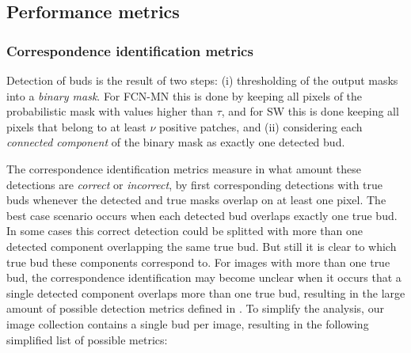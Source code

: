 \documentclass[a4paper,authoryear,review]{elsarticle}
\begin{document}
	\subsection{Performance metrics}
	\label{sec:metrics}
	
	\subsubsection{Correspondence identification metrics}
	\label{subsec:detectmetrics}
	
	Detection of buds is the result of two steps: (i)  thresholding of the output masks into a \emph{binary mask}. For FCN-MN this is done by keeping all pixels of the probabilistic mask with values higher than $\tau$, and for SW this is done keeping all pixels that belong to at least $\nu$ positive patches, and (ii) considering  each \emph{connected component} of the binary mask as exactly one detected bud. 
	
	The correspondence identification metrics measure in what amount these detections are \emph{correct} or \emph{incorrect}, by first corresponding detections with true buds whenever the detected and true masks overlap on at least one pixel. The best case scenario occurs when each detected bud overlaps exactly one true bud. In some cases this correct detection could be splitted with more than one detected component overlapping the same true bud. But still it is clear to which true bud these components correspond to. For images with more than one true bud, the correspondence identification may become unclear when it occurs that a single detected component overlaps more than one true bud, resulting in the large amount of possible detection metrics defined in \citet{oguz2017dice}. To simplify the analysis, our image collection contains a single bud per image, resulting in the following simplified list of possible metrics:
	
\end{document}

